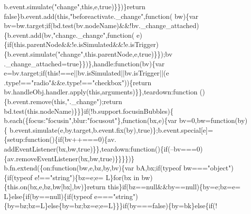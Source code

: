 \begin{DoxyCode}
      b.event.simulate(\textcolor{stringliteral}{"change"},\textcolor{keyword}{this},e,\textcolor{keyword}{true})\}\})\}\textcolor{keywordflow}{return} \textcolor{keyword}{false}\}b.event.add(\textcolor{keyword}{this},\textcolor{stringliteral}{"beforeactivate.\_change"},\textcolor{keyword}{function}(
      bw)\{var bv=bw.target;\textcolor{keywordflow}{if}(bd.test(bv.nodeName)&&!bv.\_change\_attached)\{b.event.add(bv,\textcolor{stringliteral}{"change.\_change"},\textcolor{keyword}{function}(
      e)\{\textcolor{keywordflow}{if}(this.parentNode&&!e.isSimulated&&!e.isTrigger)\{b.event.simulate(\textcolor{stringliteral}{"change"},\textcolor{keyword}{this}.parentNode,e,\textcolor{keyword}{true})\}\});bv
      .\_change\_attached=\textcolor{keyword}{true}\}\})\},handle:\textcolor{keyword}{function}(bv)\{var e=bv.target;\textcolor{keywordflow}{if}(\textcolor{keyword}{this}!==e||bv.isSimulated||bv.isTrigger||(e
      .type!==\textcolor{stringliteral}{"radio"}&&e.type!==\textcolor{stringliteral}{"checkbox"}))\{\textcolor{keywordflow}{return} bv.handleObj.handler.apply(\textcolor{keyword}{this},arguments)\}\},teardown:\textcolor{keyword}{function}
      ()\{b.event.remove(\textcolor{keyword}{this},\textcolor{stringliteral}{".\_change"});\textcolor{keywordflow}{return} bd.test(this.nodeName)\}\}\}\textcolor{keywordflow}{if}(!b.support.focusinBubbles)\{
      b.each(\{focus:\textcolor{stringliteral}{"focusin"},blur:\textcolor{stringliteral}{"focusout"}\},\textcolor{keyword}{function}(bx,e)\{var bv=0,bw=\textcolor{keyword}{function}(by)\{
      b.event.simulate(e,by.target,b.event.fix(by),\textcolor{keyword}{true})\};b.event.special[e]=\{setup:\textcolor{keyword}{function}()\{\textcolor{keywordflow}{if}(bv++===0)\{av.
      addEventListener(bx,bw,\textcolor{keyword}{true})\}\},teardown:\textcolor{keyword}{function}()\{\textcolor{keywordflow}{if}(--bv===0)\{av.removeEventListener(bx,bw,\textcolor{keyword}{true})\}\}\}\})\}
      b.fn.extend(\{on:\textcolor{keyword}{function}(bw,e,bz,by,bv)\{var bA,bx;\textcolor{keywordflow}{if}(typeof bw===\textcolor{stringliteral}{"object"})\{\textcolor{keywordflow}{if}(typeof e!==\textcolor{stringliteral}{"string"})\{bz=e;e=
      L\}\textcolor{keywordflow}{for}(bx in bw)\{this.on(bx,e,bz,bw[bx],bv)\}\textcolor{keywordflow}{return} \textcolor{keyword}{this}\}\textcolor{keywordflow}{if}(bz==null&&by==null)\{by=e;bz=e=
      L\}\textcolor{keywordflow}{else}\{\textcolor{keywordflow}{if}(by==null)\{\textcolor{keywordflow}{if}(typeof e===\textcolor{stringliteral}{"string"})\{by=bz;bz=L\}\textcolor{keywordflow}{else}\{by=bz;bz=e;e=L\}\}\}\textcolor{keywordflow}{if}(by===\textcolor{keyword}{false})\{by=bk\}\textcolor{keywordflow}{else}\{\textcolor{keywordflow}{if}(!

\end{DoxyCode}
